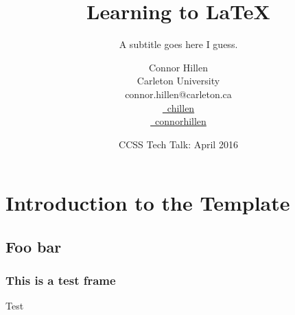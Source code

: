 \documentclass[color, 12pt]{beamer}
\title{Learning to \LaTeX}
\subtitle{A subtitle goes here I guess.}
\date[April '16]{CCSS Tech Talk: April 2016}
\author[Connor Hillen]{\linespread{0.8}\textcolor{SlatelyAccentText}{Connor Hillen}\\
\scriptsize{Carleton University}\\
\scriptsize{connor.hillen@carleton.ca}\\
\scriptsize
\href{https://github.com/Chillen}{\faGithub ~chillen}\\
\href{"https://www.linkedin.com/in/connorhillen"}{\faLinkedin ~connorhillen}
}
\begin{document}
\begin{frame}
\titlepage
\end{frame}

\section[Intro]{Introduction to the Template}
\subsection[Foo]{Foo bar}

\begin{frame} 
\frametitle{This is a test frame} 
Test
\end{frame}
\end{document}

